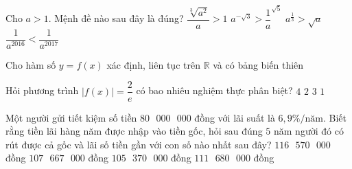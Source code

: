 \begin{ex}%
		Cho $a>1$. Mệnh đề nào sau đây là đúng?
		\choice
		{$\dfrac{\sqrt[3]{a^2}}{a}>1$}
		{\True ${a}^{-\sqrt{3}}>\dfrac{1}{a}^{\sqrt{5}}$}
		{${a}^{\tfrac{1}{3}}>\sqrt{a}$}
		{$\dfrac{1}{a^{2016}}<\dfrac{1}{a^{2017}}$}
	\end{ex}
\begin{ex}%
		Cho hàm số $y=f(x)$ xác định, liên tục trên $\mathbb{R}$ và có bảng biến thiên 
		\begin{center}
		\end{center}
		Hỏi phương trình $\left| f(x)\right|=\dfrac{2}{e}$ có bao nhiêu nghiệm thực phân biệt?
		\choice
		{\True $4$}
		{$2$}
		{$3$}
		{$1$}
	\end{ex}
\begin{ex}%
		Một người gửi tiết kiệm số tiền $80\text{ }000\text{ }000$ đồng với lãi suất là $6,9\%/\text{năm}$. Biết rằng tiền lãi hàng năm được nhập vào tiền gốc, hỏi sau đúng $5$ năm người đó có rút được cả gốc và lãi số tiền gần với con số nào nhất sau đây?
		\choice
		{$116\text{ }570\text{ }000$ đồng}
		{$107\text{ }667\text{ }000$ đồng}
		{$105\text{ }370\text{ }000$ đồng}
		{\True $111\text{ }680\text{ }000$ đồng}
	\end{ex}
